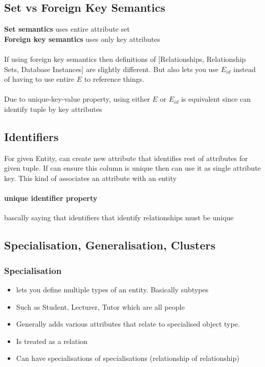 \documentclass{article}
\begin{document}
	\subsection{Set vs Foreign Key Semantics}
		\textbf{Set semantics} uses entire attribute set\\
		\textbf{Foreign key semantics} uses only key attributes
		\\\\If using foreign key semantics then definitions of [Relationships, Relationship Sets, Database Instances] are slightly different. But also lets you use $E_{id}$ instead of having to use entire $E$ to reference things.
		\\\\Due to unique-key-value property, using either $E$ or $E_{id}$ is equivalent since can identify tuple by key attributes

	\subsection{Identifiers}
		For given Entity, can create new attribute that identifies rest of attributes for given tuple. If can ensure this column is unique then can use it as single attribute key. This kind of associates an attribute with an entity

		\paragraph{unique identifier property} bascally saying that identifiers that identify relationships must be unique

	\subsection{Specialisation, Generalisation, Clusters}
		\subsubsection{Specialisation}
			\begin{itemize}
				\item lets you define multiple types of an entity. Basically subtypes
				\item Such as Student, Lecturer, Tutor which are all people
				\item Generally adds various attributes that relate to specialised object type.
				\item Is treated as a relation
				\item Can have specialisations of specialisations (relationship of relationship)
			\end{itemize}
\end{document}
